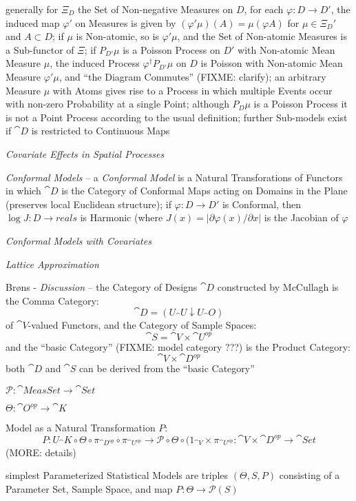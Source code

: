 generally for $\Xi_D$ the Set of Non-negative Measures on $D$, for each
$\varphi : D \to D'$, the induced map $\varphi'$ on Measures is given by
$(\varphi' \mu)(A) = \mu(\varphi A)$ for $\mu \in \Xi_D'$ and $A \subset D$; if
$\mu$ is Non-atomic, so is $\varphi' \mu$, and the Set of Non-atomic Measures is
a Sub-functor of $\Xi$; if $P_{D'}\mu$ is a Poisson Process on $D'$ with
Non-atomic Mean Measure $\mu$, the induced Process
$\varphi^\dagger P_{D'}\mu$ on $D$ is Poisson with Non-atomic Mean Measure
$\varphi'\mu$, and ``the Diagram Commutes'' (FIXME: clarify); an arbitrary
Measure $\mu$ with Atoms gives rise to a Process in which multiple Events occur
with non-zero Probability at a single Point; although $P_D\mu$ is a Poisson
Process it is not a Point Process according to the usual definition; further
Sub-models exist if $\cat{D}$ is restricted to Continuous Maps

\emph{Covariate Effects in Spatial Processes}

\emph{Conformal Models} -- a \emph{Conformal Model} is a Natural Transforations
of Functors in which $\cat{D}$ is the Category of Conformal Maps acting on
Domains in the Plane (preserves local Euclidean structure); if
$\varphi : D \to D'$ is Conformal, then $\log J : D \to reals$ is Harmonic
(where $J(x) = |\partial\varphi(x) / \partial x|$ is the Jacobian of $\varphi$

\emph{Conformal Models with Covariates}

\emph{Lattice Approximation}

Br{\o}ns - \emph{Discussion} -- the Category of Designs $\cat{D}$ constructed by
McCullagh is the Comma Category:
\[
  \cat{D} = (U_\cat{U} \downarrow U_\cat{O})
\]
of $\cat{V}$-valued Functors, and the Category of Sample Spaces:
\[
  \cat{S} = \cat{V} \times \cat{U}^{op}
\]
and the ``basic Category'' (FIXME: model category ???) is the Product Category:
\[
  \cat{V} \times \cat{D}^{op}
\]
both $\cat{D}$ and $\cat{S}$ can be derived from the ``basic Category''

$\mathcal{P} : \cat{MeasSet} \to \cat{Set}$

$\Theta : \cat{O}^{op} \to \cat{K}$

Model as a Natural Transformation $P$:
\[
  P : U_\cat{K} \circ \Theta \circ \pi_{\cat{D}^{op}} \circ \pi_{\cat{U}^{op}}
    \to \mathcal{P} \circ \Theta \circ (1_{\cat{V}} \times \pi_{\cat{U}^{op}}
    : \cat{V} \times \cat{D}^{op} \to \cat{Set}
\]
(MORE: details)

simplest Parameterized Statistical Models are triples $(\Theta, S, P)$
consisting of a Parameter Set, Sample Space, and map
$P : \Theta \to \mathcal{P}(S)$

